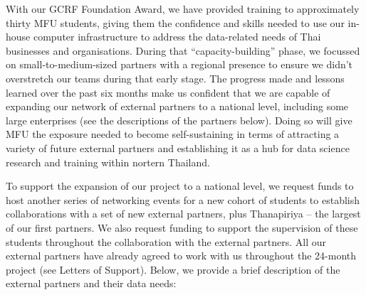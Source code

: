 \documentclass[11pt]{article}
\begin{document}
  \vspace{2mm}
  \noindent
  With our GCRF Foundation Award, we have provided training to approximately thirty MFU students, giving them the confidence and skills needed to use our in-house computer infrastructure to address the data-related needs of Thai businesses and organisations. During that ``capacity-building'' phase, we focussed on small-to-medium-sized partners with a regional presence to ensure we didn't overstretch our teams during that early stage. The progress made and lessons learned over the past six months make us confident that we are capable of expanding our network of external partners to a national level, including some large enterprises (see the descriptions of the partners below). Doing so will give MFU the exposure needed to become self-sustaining in terms of attracting a variety of future external partners and establishing it as a hub for data science research and training within nortern Thailand.

  \vspace{2mm}
  \noindent
  To support the expansion of our project to a national level, we request funds to host another series of networking events for a new cohort of students to establish collaborations with a set of new external partners, plus Thanapiriya -- the largest of our first partners. We also request funding to support the supervision of these students throughout the collaboration with the external partners. All our external partners have already agreed to work with us throughout the 24-month project (see Letters of Support). Below, we provide a brief description of the external partners and their data needs:
  
\end{document}
